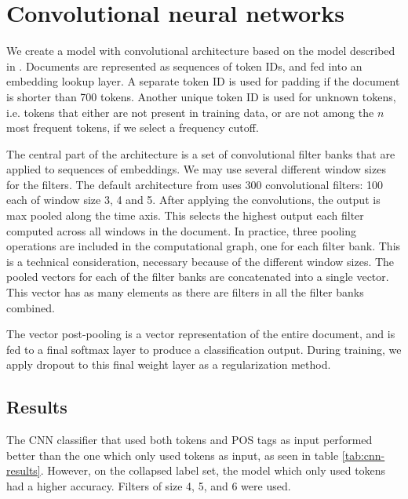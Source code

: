 \section{Convolutional neural networks}

We create a model with convolutional architecture based on the model
described in \textcite{kim2014convolutional}. Documents are represented as
sequences of token IDs, and fed into an embedding lookup layer. A separate
token ID is used for padding if the document is shorter than 700 tokens.
Another unique token ID is used for unknown tokens, i.e. tokens that either
are not present in training data, or are not among the $n$ most frequent
tokens, if we select a frequency cutoff.

The central part of the architecture is a set of convolutional filter banks
that are applied to sequences of embeddings. We may use several different
window sizes for the filters. The default architecture from
\textcite{kim2014convolutional} uses 300 convolutional filters: 100 each of
window size 3, 4 and 5. After applying the convolutions, the output is max
pooled along the time axis. This selects the highest output each filter
computed across all windows in the document. In practice, three pooling
operations are included in the computational graph, one for each filter bank.
This is a technical consideration, necessary because of the different window
sizes. The pooled vectors for each of the filter banks are concatenated into
a single vector. This vector has as many elements as there are filters in all
the filter banks combined.

The vector post-pooling is a vector representation of the entire document,
and is fed to a final softmax layer to produce a classification output.
During training, we apply dropout to this final weight layer as a
regularization method.


\subsection{Results}

The \ac{CNN} classifier that used both tokens and POS tags as input performed
better than the one which only used tokens as input, as seen in table
\ref{tab:cnn-results}. However, on the collapsed label set, the model which only
used tokens had a higher accuracy. Filters of size 4, 5, and 6 were used.

